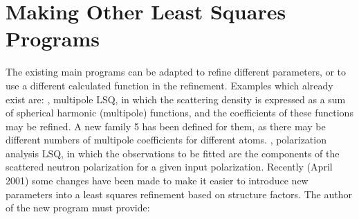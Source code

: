 \section{Making Other Least Squares Programs}
%
The existing main programs can be adapted to refine different parameters,
or to use a different calculated function in the refinement.  Examples
which already exist are:
\p
{}, multipole LSQ, in which the scattering density is expressed as a sum
of spherical harmonic (multipole) functions, and the coefficients of these
functions  may be refined.  A new family 5 has been defined for
them, as there may be different numbers of multipole coefficients for 
different atoms.
\p
{}, polarization analysis LSQ, in which the observations to be fitted
are the components of the scattered neutron polarization for a given input
polarization.
\p
Recently (April 2001) some changes have been made to make it easier to introduce new parameters
   into a least squares refinement based on structure factors. The author of the
   new program must provide:
